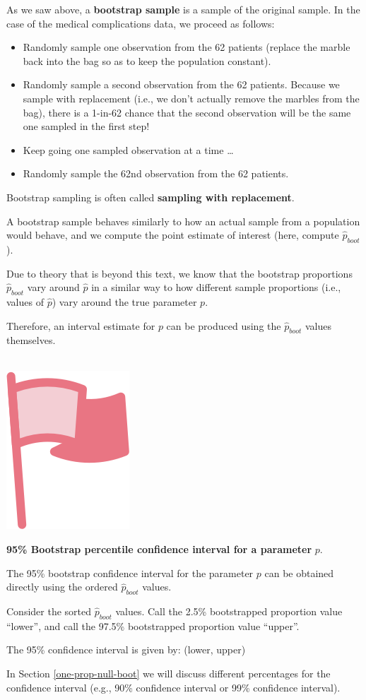\documentclass[
  10pt,
  openany]{book}
\providecommand{\tightlist}{%
  \setlength{\itemsep}{0pt}\setlength{\parskip}{0pt}}
\newenvironment{mdframedwithfootImportant}
{   
    \savenotes
    \begin{mdframed}[%
    topline=true, bottomline=true, linecolor=oiR, linewidth=0.5pt,
    rightline=false, leftline=false,
    backgroundcolor=oiLGray]
    \renewcommand{\thempfootnote}{\arabic{footnote}}
    }
{
    \end{mdframed}
    \spewnotes
}
\newenvironment{important}{
    \let\oldtextbf\textbf
    \renewcommand{\textbf}[1]{{\textcolor{oiR}{\oldtextbf{##1}}}}
\vspace{4mm}
\begin{mdframedwithfootImportant}
\begin{minipage}[t]{0.10\textwidth}
{$\:$ \\ \setkeys{Gin}{width=2.5em,keepaspectratio}\includegraphics{images/_icons/important.png}}
\end{minipage}
\hfill
\begin{minipage}[t]{0.90\textwidth}
\vspace{-2mm}
\setlength{\parskip}{1em}
}{\end{minipage}
\end{mdframedwithfootImportant}
\vspace{4mm}
}
\begin{document}
As we saw above, a \textbf{bootstrap sample} is a sample of the original sample.
In the case of the medical complications data, we proceed as follows:

\begin{itemize}
\tightlist
\item
  Randomly sample one observation from the 62 patients (replace the marble back into the bag so as to keep the population constant).
\item
  Randomly sample a second observation from the 62 patients. Because we sample with replacement (i.e., we don't actually remove the marbles from the bag), there is a 1-in-62 chance that the second observation will be the same one sampled in the first step!
\item
  Keep going one sampled observation at a time \ldots{}
\item
  Randomly sample the 62nd observation from the 62 patients.
\end{itemize}

Bootstrap sampling is often called \textbf{sampling with replacement}.

A bootstrap sample behaves similarly to how an actual sample from a population would behave, and we compute the point estimate of interest (here, compute \(\hat{p}_{boot}\)).

Due to theory that is beyond this text, we know that the bootstrap proportions \(\hat{p}_{boot}\) vary around \(\hat{p}\) in a similar way to how different sample proportions (i.e., values of \(\hat{p}\)) vary around the true parameter \(p.\)

Therefore, an interval estimate for \(p\) can be produced using the \(\hat{p}_{boot}\) values themselves.

\begin{important}
\textbf{95\% Bootstrap percentile confidence interval for a parameter} \(p.\)

The 95\% bootstrap confidence interval for the parameter \(p\) can be obtained directly using the ordered \(\hat{p}_{boot}\) values.

Consider the sorted \(\hat{p}_{boot}\) values.
Call the 2.5\% bootstrapped proportion value ``lower'', and call the 97.5\% bootstrapped proportion value ``upper''.

The 95\% confidence interval is given by: (lower, upper)

\end{important}

In Section \ref{one-prop-null-boot} we will discuss different percentages for the confidence interval (e.g., 90\% confidence interval or 99\% confidence interval).
\end{document}
